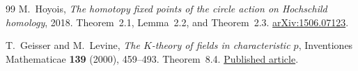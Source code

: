 \documentclass[11pt,a4paper]{article}
\theoremstyle{remark}
\begin{document}
\begin{thebibliography}{99}
M.~Hoyois, \emph{The homotopy fixed points of the circle action on
Hochschild homology}, 2018. Theorem~2.1, Lemma~2.2, and Theorem~2.3.
\href{https://arxiv.org/abs/1506.07123}{arXiv:1506.07123}.


T.~Geisser and M.~Levine, \emph{The $K$-theory of fields in
characteristic $p$}, Inventiones Mathematicae \textbf{139}
(2000), 459--493. Theorem~8.4.
\href{https://www2.rikkyo.ac.jp/web/geisser/p-part.pdf}{Published article}.

\end{thebibliography}
\end{document}
